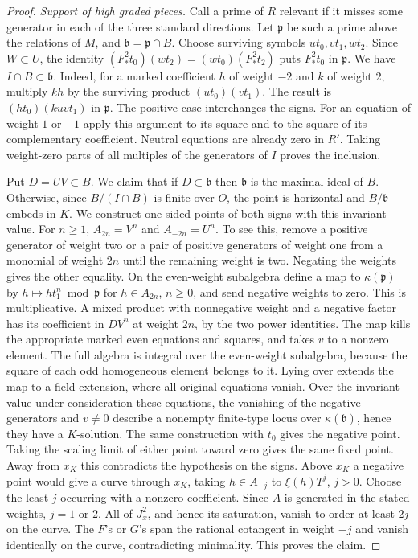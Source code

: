 \begin{proof}
\emph{Support of high graded pieces.}
Call a prime of \(R\) relevant if it misses some generator in each
of the three standard directions. Let \(\mathfrak p\) be such a prime
above the relations of \(M\), and \(\mathfrak b=\mathfrak p\cap B\).
Choose surviving symbols \(ut_0,vt_1,wt_2\). Since \(W\subset U\),
the identity \((F_*^2t_0)(wt_2)=(wt_0)(F_*^2t_2)\) puts
\(F_*^2t_0\) in \(\mathfrak p\). We have \(I\cap B\subset\mathfrak b\).
Indeed, for a marked coefficient \(h\) of weight \(-2\) and \(k\)
of weight \(2\), multiply \(kh\) by the surviving product
\((ut_0)(vt_1)\). The result is \((ht_0)(kuv t_1)\) in
\(\mathfrak p\). The positive case interchanges the signs. For an
equation of weight \(1\) or \(-1\) apply this argument to its square
and to the square of its complementary coefficient. Neutral equations
are already zero in \(R'\). Taking weight-zero parts of all
multiples of the generators of \(I\) proves the inclusion.

Put \(D=UV\subset B\). We claim that if \(D\subset\mathfrak b\)
then \(\mathfrak b\) is the maximal ideal of \(B\). Otherwise,
since \(B/(I\cap B)\) is finite over \(O\), the point is horizontal
and \(B/\mathfrak b\) embeds in \(K\). We construct one-sided points
of both signs with this invariant value. For \(n\ge1\),
\(A_{2n}=V^n\) and \(A_{-2n}=U^n\). To see this, remove a positive
generator of weight two or a pair of positive generators of weight
one from a monomial of weight \(2n\) until the remaining weight is
two. Negating the weights gives the other equality.
On the even-weight subalgebra define a map to \(\kappa(\mathfrak p)\)
by \(h\mapsto ht_1^n\bmod\mathfrak p\) for \(h\in A_{2n}\), \(n\ge0\),
and send negative weights to zero. This is multiplicative. A mixed
product with nonnegative weight and a negative factor has its
coefficient in \(D V^n\) at weight \(2n\), by the two power
identities. The map kills the appropriate marked even equations and
squares, and takes \(v\) to a nonzero element. The full algebra is
integral over the even-weight subalgebra, because the square of
each odd homogeneous element belongs to it. Lying over extends the
map to a field extension, where all original equations vanish.
Over the invariant value under consideration these equations, the
vanishing of the negative generators and \(v\ne0\) describe a
nonempty finite-type locus over \(\kappa(\mathfrak b)\), hence they
have a \(K\)-solution. The same construction with \(t_0\) gives the
negative point. Taking the scaling limit of either point toward
zero gives the same fixed point. Away from \(x_K\) this contradicts
the hypothesis on the signs. Above \(x_K\) a negative point would
give a curve through \(x_K\), taking \(h\in A_{-j}\) to
\(\xi(h)T^j\), \(j>0\). Choose the least \(j\) occurring with a
nonzero coefficient. Since \(A\) is generated in the stated weights,
\(j=1\) or \(2\). All of \(J_x^2\), and hence its saturation, vanish
to order at least \(2j\) on the curve. The \(F\)'s or \(G\)'s span
the rational cotangent in weight \(-j\) and vanish identically on
the curve, contradicting minimality. This proves the claim.


\end{proof}
